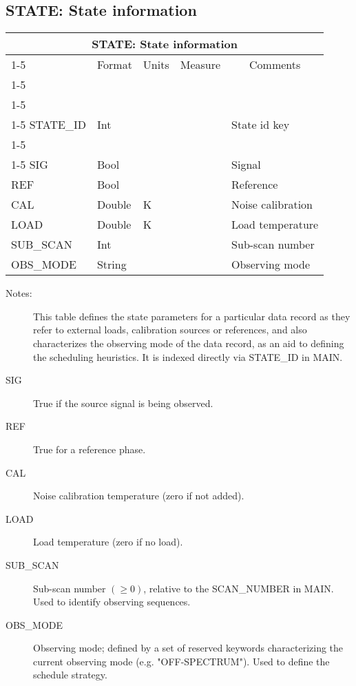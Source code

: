 \documentclass{article}
\newcommand{\defline}[1]{\cline{1-5}
\multicolumn{5}{|l|}{#1} \\
\cline{1-5}}
\newcommand{\definetable}[2]
{
	\vfill\newpage
	\subsection{#1}
        \vspace{0.15in}
        \small
	\begin{tabular}{|l|p{1.25in}|l|p{.9in}|p{1.4in}|}
	\hline
	\multicolumn{5}{|c|}{\bf #1}\\ 
	\cline{1-5}
        \multicolumn{1}{|c|}{Name}&\multicolumn{1}{|c|}{Format}&
        \multicolumn{1}{|c|}{Units}&\multicolumn{1}{|c|}{Measure}&
        \multicolumn{1}{|c|}{Comments}\\
        \cline{1-5}
        #2
        \hline
	\end{tabular}
}
\begin{document}
\definetable{STATE: State information}{
\defline{\bf Columns}
\defline{\em Key}
STATE\_ID   &     Int  &           &        & State id key \\
\defline{\em Data}  
SIG   &     Bool  &           &        & Signal \\
REF   &     Bool  &           &        & Reference \\
CAL   &     Double &   K      &        & Noise calibration \\
LOAD  &     Double &   K      &        & Load temperature\\
SUB\_SCAN &  Int   &          &        & Sub-scan number\\
OBS\_MODE &  String &         &        & Observing mode\\
}
\begin{description}

\item[Notes:] This table defines the state parameters for a particular
data record as they refer to external loads, calibration sources or
references, and also characterizes the observing mode of the data
record, as an aid to defining the scheduling heuristics. It is indexed
directly via STATE\_ID in MAIN.

\item[SIG] True if the source signal is being observed.

\item[REF] True for a reference phase.

\item[CAL] Noise calibration temperature (zero if not added).

\item[LOAD] Load temperature (zero if no load).

\item[SUB\_SCAN] Sub-scan number $(\geq 0)$, relative to the
SCAN\_NUMBER in MAIN. Used to identify observing sequences.

\item[OBS\_MODE] Observing mode; defined by a set of reserved keywords
characterizing the current observing mode (e.g. "OFF-SPECTRUM"). Used
to define the schedule strategy.

\end{description}
\end{document}
